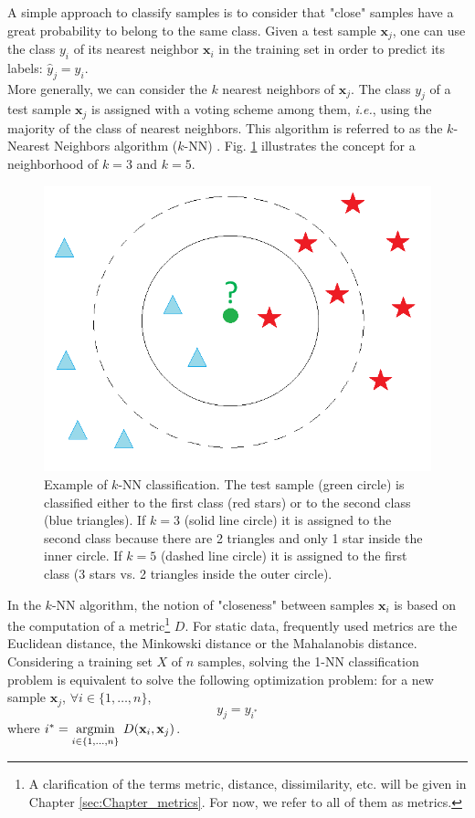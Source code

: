 A simple approach to classify samples is to consider that "close" samples have a great probability to belong to the same class. Given a test sample $\textbf{x}_j$, one can use the class $y_i$ of its nearest neighbor $\textbf{x}_i$ in the training set in order to predict its labels: $\hat{y}_j=y_i$. \\
\noindent More generally, we can consider the $k$ nearest neighbors of $\textbf{x}_j$. The class $y_j$ of a test sample $\textbf{x}_j$ is assigned with a voting scheme among them, \textit{i.e.}, using the majority of the class of nearest neighbors. This algorithm is referred to as the $k$-Nearest Neighbors algorithm ($k$-NN) 
\cite{Silverman1989,Cover1967b}. Fig. \ref{fig:kNN_example} illustrates the concept for a neighborhood of $k=3$ and $k=5$.

\begin{figure}[h!]
\centering
\includegraphics[width=0.40\linewidth]{images/kNN_example}
\caption[Example of $k$-NN classification.]{Example of $k$-NN classification. The test sample (green circle) is classified either to the first class (red stars) or to the second class (blue triangles). If $k = 3$ (solid line circle) it is assigned to the second class because there are 2 triangles and only 1 star inside the inner circle. If $k = 5$ (dashed line circle) it is assigned to the first class (3 stars vs. 2 triangles inside the outer circle).}
\label{fig:kNN_example}
\end{figure}

\indent In the $k$-NN algorithm, the notion of "closeness" between samples $\textbf{x}_i$ is based on the computation of a metric\footnote{A clarification of the terms metric, distance, dissimilarity, etc. will be given in Chapter \ref{sec:Chapter_metrics}. For now, we refer to all of them as metrics.} $D$. For static data, frequently used metrics are the Euclidean distance, the Minkowski distance or the Mahalanobis distance. Considering a training set $X$ of $n$ samples, solving the 1-NN classification problem is equivalent to solve the following optimization problem: for a new sample $\textbf{x}_j$, $\forall i \in \{1,\ldots,n\}$,
\begin{equation}
y_j = y_{i^*}
\end{equation}
where $i^*={\underset{i \in \{1,\ldots,n\}}{\argmin}  \text{ } D(\textbf{x}_i,\textbf{x}_j)}$.

